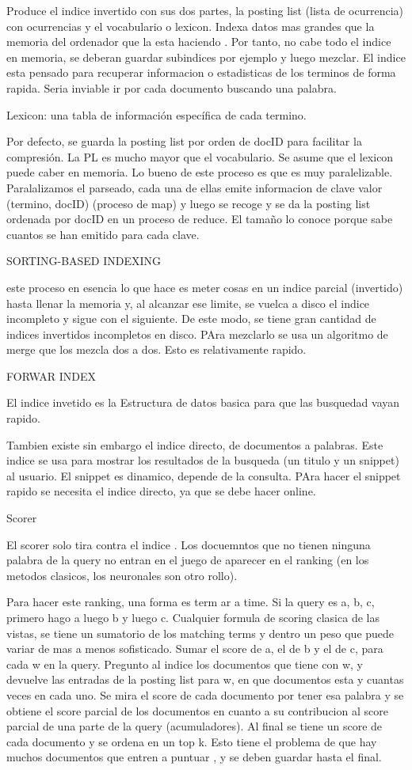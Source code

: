 Produce el indice invertido con sus dos partes, la posting list (lista de ocurrencia) con ocurrencias y el vocabulario o lexicon. Indexa datos mas grandes que la memoria del ordenador que la esta haciendo . Por tanto, no cabe todo el indice en memoria, se deberan guardar subindices por ejemplo y luego mezclar. El indice esta pensado para recuperar informacion o estadisticas de los terminos de forma rapida. Seria inviable ir por cada documento buscando una palabra. 

Lexicon: una tabla de información específica de cada termino. 

Por defecto, se guarda la posting list por orden de docID para facilitar la compresión. La PL es mucho mayor que el vocabulario. Se asume que el lexicon puede caber en memoria. Lo bueno de este proceso es que es muy paralelizable. Paralalizamos el parseado, cada una de ellas emite informacion de clave valor (termino, docID) (proceso de map) y luego se recoge y se da la posting list ordenada por docID en un proceso de reduce. El tamaño lo conoce porque sabe cuantos se han emitido para cada clave. 

SORTING-BASED INDEXING

este proceso en esencia lo que hace es meter cosas en un indice parcial (invertido) hasta llenar la memoria y, al alcanzar ese limite, se vuelca a disco el indice incompleto y sigue con el siguiente. De este modo, se tiene gran cantidad de indices invertidos incompletos en disco. PAra mezclarlo se usa un algoritmo de merge que los mezcla dos a dos. Esto es relativamente rapido. 


FORWAR INDEX 

El indice invetido es la Estructura de datos basica para que las busquedad vayan rapido. 

Tambien existe sin embargo el indice directo, de documentos a palabras. Este indice se usa para mostrar los resultados de la busqueda (un titulo y un snippet) al usuario. El snippet es dinamico, depende de la consulta. PAra hacer el snippet rapido se necesita el indice directo, ya que se debe hacer online. 

Scorer

El scorer solo tira contra el indice . Los docuemntos que no tienen ninguna palabra de la query no entran en el juego de aparecer en el ranking (en los metodos clasicos, los neuronales son otro rollo).

Para hacer este ranking, una forma es term ar a time. Si la query es a, b, c, primero hago a luego b y luego c. Cualquier formula de scoring clasica de las vistas, se tiene un sumatorio de los matching terms y dentro un peso que puede variar de mas a menos sofisticado. Sumar el score de a, el de b y el de c, para cada w en la query. Pregunto al indice los documentos que tiene con w, y devuelve las entradas de la posting list para w, en que documentos esta y cuantas veces en cada uno. Se mira el score de cada documento por tener esa palabra y se obtiene el score parcial de los documentos en cuanto a su contribucion al score parcial de una parte de la query (acumuladores). Al final se tiene un score de cada documento y se ordena en un top k. Esto tiene el problema de que hay muchos documentos que entren a puntuar , y se deben guardar hasta el final. 

